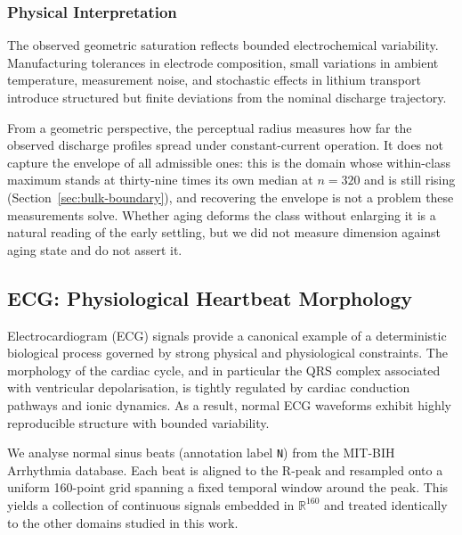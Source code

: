 \documentclass[10pt]{article}
\theoremstyle{plain}
\theoremstyle{definition}
\theoremstyle{remark}
\begin{document}
\subsubsection{Physical Interpretation}
The observed geometric saturation reflects bounded electrochemical variability.
Manufacturing tolerances in electrode composition, small variations in ambient
temperature, measurement noise, and stochastic effects in lithium transport
introduce structured but finite deviations from the nominal discharge trajectory.

From a geometric perspective, the perceptual radius measures how far the
observed discharge profiles spread under constant-current operation. It does not
capture the envelope of all admissible ones: this is the domain whose
within-class maximum stands at thirty-nine times its own median at $n=320$ and
is still rising (Section~\ref{sec:bulk-boundary}), and recovering the envelope
is not a problem these measurements solve. Whether aging deforms the class
without enlarging it is a natural reading of the early settling, but we did not
measure dimension against aging state and do not assert it.



\subsection{ECG: Physiological Heartbeat Morphology}

Electrocardiogram (ECG) signals provide a canonical example of a deterministic
biological process governed by strong physical and physiological constraints.
The morphology of the cardiac cycle, and in particular the QRS complex
associated with ventricular depolarisation, is tightly regulated by cardiac
conduction pathways and ionic dynamics. As a result, normal ECG waveforms
exhibit highly reproducible structure with bounded variability.

We analyse normal sinus beats (annotation label \texttt{N}) from the MIT-BIH
Arrhythmia database. Each beat is aligned to the R-peak and resampled onto a
uniform 160-point grid spanning a fixed temporal window around the peak. This
yields a collection of continuous signals embedded in $\mathbb{R}^{160}$ and
treated identically to the other domains studied in this work.

\end{document}
